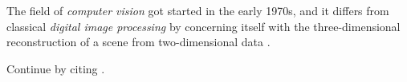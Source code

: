 The field of \textit{computer vision} got started in the early 1970s, and it differs from classical \textit{digital image processing} by concerning itself with the three-dimensional reconstruction of a scene from two-dimensional data \cite[p.~10]{computer_vision_history}.

Continue by citing \cite{image_recognition}.
